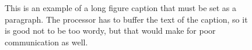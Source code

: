 \begin{figure}
\caption{This is an example of a long figure caption that must be set as
a paragraph.  The processor has to buffer the text of the
caption, so it is good not to be too wordy, but that would make for
poor communication as well. \label{fig3}}
\end{figure}



%


